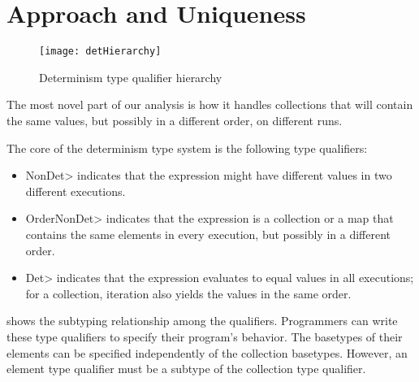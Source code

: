 \section{Approach and Uniqueness\label{sec:approach}}
\begin{figure}
    \begin{center}
        \texttt{[image: detHierarchy]}
    \end{center}
    \caption{Determinism type qualifier hierarchy}
    \label{fig:determinism-hierarchy}
\end{figure}

The most novel part of our analysis is how it handles collections that will
contain the same values, but
possibly in a different order, on different runs.

The core of the determinism type system
is the following type qualifiers:
\begin{itemize}
    \item \<NonDet> indicates
    that the expression might have different values in two different executions.
    \item \<OrderNonDet> indicates that the expression is a collection or
    a map that contains the same elements in every execution, but possibly
    in a different order.
    \item \<Det> indicates that the expression evaluates to equal values in
    all executions; for a collection, iteration
    also yields the values in the same order.
\end{itemize}
 shows the subtyping
relationship among the qualifiers.
Programmers can write these type qualifiers to specify their program's behavior.
The basetypes of their elements can be specified independently of the collection basetypes.
However, an element type qualifier must be a subtype of the collection type qualifier.
